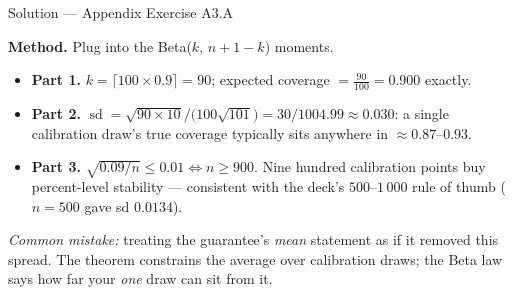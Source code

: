 \documentclass[aspectratio=169,11pt]{beamer}
\begin{document}
\begin{frame}{Solution --- Appendix Exercise A3.A}
\begin{solutionbox}
  \textbf{Method.} Plug into the Beta($k$, $n+1-k$) moments.
  \begin{itemize}
    \item \textbf{Part 1.} $k = \lceil 100 \times 0.9 \rceil = 90$; expected coverage
          $= \tfrac{90}{100} = 0.900$ exactly.
    \item \textbf{Part 2.} $\operatorname{sd} =
          \sqrt{90 \times 10} \big/ \big(100 \sqrt{101}\big)
          = 30 / 1004.99 \approx 0.030$: a single calibration draw's true coverage
          typically sits anywhere in $\approx 0.87$--$0.93$.
    \item \textbf{Part 3.} $\sqrt{0.09 / n} \le 0.01 \iff n \ge 900$. Nine
          hundred calibration points buy percent-level stability --- consistent with
          the deck's $500$--$1\,000$ rule of thumb ($n = 500$ gave sd $0.0134$).
  \end{itemize}
  \textit{Common mistake:} treating the guarantee's \emph{mean} statement as if it
  removed this spread. The theorem constrains the average over calibration draws;
  the Beta law says how far your \emph{one} draw can sit from it.
\end{solutionbox}
\end{frame}
\end{document}
